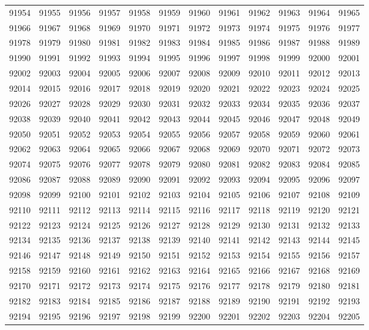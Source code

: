 \begin{center}
\begin{longtable}{llllllllllll}
91954 &91955 &91956 &91957 &91958 &91959 &91960 &91961 &91962 &91963 &91964 &91965 \\
91966 &91967 &91968 &91969 &91970 &91971 &91972 &91973 &91974 &91975 &91976 &91977 \\
91978 &91979 &91980 &91981 &91982 &91983 &91984 &91985 &91986 &91987 &91988 &91989 \\
91990 &91991 &91992 &91993 &91994 &91995 &91996 &91997 &91998 &91999 &92000 &92001 \\
92002 &92003 &92004 &92005 &92006 &92007 &92008 &92009 &92010 &92011 &92012 &92013 \\
92014 &92015 &92016 &92017 &92018 &92019 &92020 &92021 &92022 &92023 &92024 &92025 \\
92026 &92027 &92028 &92029 &92030 &92031 &92032 &92033 &92034 &92035 &92036 &92037 \\
92038 &92039 &92040 &92041 &92042 &92043 &92044 &92045 &92046 &92047 &92048 &92049 \\
92050 &92051 &92052 &92053 &92054 &92055 &92056 &92057 &92058 &92059 &92060 &92061 \\
92062 &92063 &92064 &92065 &92066 &92067 &92068 &92069 &92070 &92071 &92072 &92073 \\
92074 &92075 &92076 &92077 &92078 &92079 &92080 &92081 &92082 &92083 &92084 &92085 \\
92086 &92087 &92088 &92089 &92090 &92091 &92092 &92093 &92094 &92095 &92096 &92097 \\
92098 &92099 &92100 &92101 &92102 &92103 &92104 &92105 &92106 &92107 &92108 &92109 \\
92110 &92111 &92112 &92113 &92114 &92115 &92116 &92117 &92118 &92119 &92120 &92121 \\
92122 &92123 &92124 &92125 &92126 &92127 &92128 &92129 &92130 &92131 &92132 &92133 \\
92134 &92135 &92136 &92137 &92138 &92139 &92140 &92141 &92142 &92143 &92144 &92145 \\
92146 &92147 &92148 &92149 &92150 &92151 &92152 &92153 &92154 &92155 &92156 &92157 \\
92158 &92159 &92160 &92161 &92162 &92163 &92164 &92165 &92166 &92167 &92168 &92169 \\
92170 &92171 &92172 &92173 &92174 &92175 &92176 &92177 &92178 &92179 &92180 &92181 \\
92182 &92183 &92184 &92185 &92186 &92187 &92188 &92189 &92190 &92191 &92192 &92193 \\
92194 &92195 &92196 &92197 &92198 &92199 &92200 &92201 &92202 &92203 &92204 &92205 \\

\end{longtable}
\end{center}
